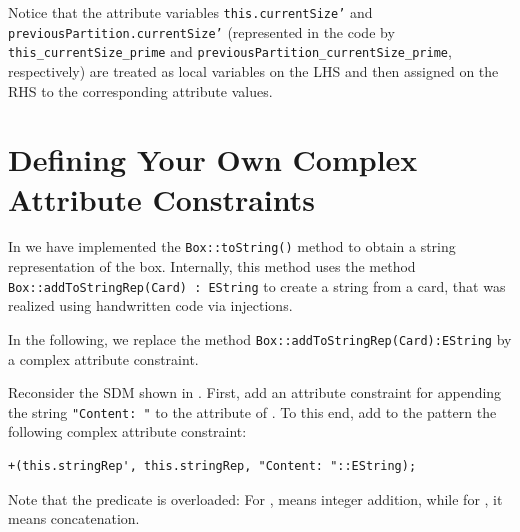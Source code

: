 Notice that the attribute variables \texttt{this.currentSize'} and \\
\texttt{previousPartition.currentSize'} (represented in the code by \\ 
\texttt{this\_currentSize\_prime} and \texttt{previousPartition\_currentSize\_prime}, respectively) are treated as local variables on the LHS and then assigned on the RHS to the corresponding attribute values.

\section{Defining Your Own Complex Attribute Constraints}  
In  we have implemented the \texttt{Box::toString()} method to obtain a string representation of the box. 
Internally, this method uses the method \texttt{Box::addToStringRep(Card) : EString} to create a string from a card, that was realized using handwritten code via injections.

In the following, we replace the method \texttt{Box::addToStringRep(Card):EString} by a complex attribute constraint.

\begin{stepbystep}
\item 
Reconsider the SDM shown in .
First, add an attribute constraint for appending the string \texttt{"Content: "} to the  attribute of .
To this end, add to the  pattern the following complex attribute constraint:
\begin{verbatim}
+(this.stringRep', this.stringRep, "Content: "::EString);
\end{verbatim}
\end{stepbystep}  
Note that the predicate \entity{+} is overloaded: For , \entity{+} means integer addition, while for , it means concatenation.
   	  


